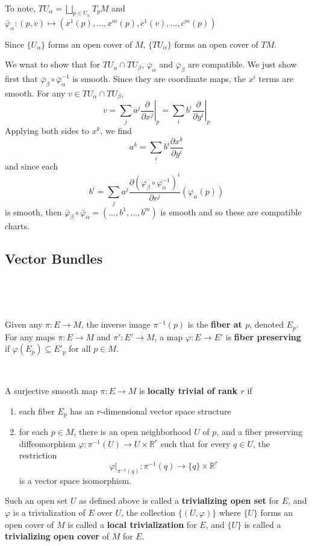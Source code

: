 \documentclass{article}
\begin{document}
\begin{customproof}
  \

  To note, $TU_\alpha = \bigsqcup_{p \in U_\alpha} T_pM$ and $\bar{\varphi}_\alpha: (p, v) \mapsto (x^1(p), \dots, x^m(p), c^1(v), \dots, c^m(p))$

  Since $\{U_\alpha\}$ forms an open cover of $M$, $\{TU_\alpha\}$ forms an open cover of $TM$.

  We wnat to show that for $TU_\alpha \cap TU_\beta$, $\bar{\varphi}_\alpha$ and $\bar{\varphi}_\beta$ are compatible. We just show first that $\bar{\varphi}_\beta \circ \bar{\varphi}_\alpha ^{-1}$ is smooth. Since they are coordinate maps, the $x^i$ terms are smooth. For any $v \in TU_\alpha \cap TU_\beta$, $$v = \sum_j a^j \left.\frac{\partial}{\partial x^j}\right\vert_p = \sum_i b^i \left.\frac{\partial}{\partial y^i}\right\vert_p$$Applying both sides to $x^k$, we find $$a^k = \sum_i b^i \frac{\partial x^k}{\partial y^i}$$and since each $$b^i = \sum_j a^j \frac{\partial(\varphi_\beta \circ \varphi_\alpha ^{-1})^i}{\partial r^j}(\varphi_\alpha(p))$$ is smooth, then $\bar{\varphi}_\beta \circ \bar{\varphi}_\alpha = (\dots, b^1, \dots, b^m)$ is smooth and so these are compatible charts.
\end{customproof}

\subsection{Vector Bundles}
\

\begin{definition}[Fibers]
  \

  Given any $\pi: E \to M$, the inverse image $\pi ^{-1}(p)$ is the \textbf{fiber at $p$}, denoted $E_p$. For any maps $\pi: E \to M$ and $\pi': E' \to M$, a map $\varphi: E \to E'$ is \textbf{fiber preserving} if $\varphi(E_p) \subseteq E'_p$ for all $p \in M$.
\end{definition}

\begin{definition}
  \

  A surjective smooth map $\pi: E \to M$ is \textbf{locally trivial of rank $r$} if
  \begin{enumerate}
    \item each fiber $E_p$ has an $r$-dimensional vector space structure
    \item for each $p \in M$, there is an open neighborhood $U$ of $p$, and a fiber preserving diffeomorphism $\varphi: \pi ^{-1}(U) \to U \times \mathbb{R}^r$ such that for every $q \in U$, the restriction $$\varphi \vert_{\pi ^{-1}(q)}: \pi ^{-1}(q) \to \{q\} \times \mathbb{R}^r$$is a vector space isomorphism.
  \end{enumerate}

  Such an open set $U$ as defined above is called a \textbf{trivializing open set} for $E$, and $\varphi$ is a trivialization of $E$ over $U$, the collection $\{(U, \varphi)\}$ where $\{U\}$ forms an open cover of $M$ is called a \textbf{local trivialization} for $E$, and $\{U\}$ is called a \textbf{trivializing open cover} of $M$ for $E$.
\end{definition}
\end{document}
